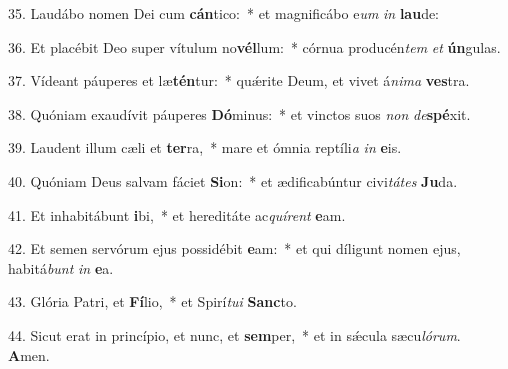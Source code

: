 35. Laudábo nomen Dei cum \textbf{cán}tico:~*  et magnificábo e\textit{um} \textit{in} \textbf{lau}de:\

36. Et placébit Deo super vítulum no\textbf{vél}lum:~*  córnua producén\textit{tem} \textit{et} \textbf{ún}gulas.\

37. Vídeant páuperes et læ\textbf{tén}tur:~*  quǽrite Deum, et vivet á\textit{ni}\textit{ma} \textbf{ves}tra.\

38. Quóniam exaudívit páuperes \textbf{Dó}minus:~*  et vinctos suos \textit{non} \textit{de}\textbf{spé}xit.\

39. Laudent illum cæli et \textbf{ter}ra,~*  mare et ómnia reptíli\textit{a} \textit{in} \textbf{e}is.\

40. Quóniam Deus salvam fáciet \textbf{Si}on:~*  et ædificabúntur civi\textit{tá}\textit{tes} \textbf{Ju}da.\

41. Et inhabitábunt \textbf{i}bi,~*  et hereditáte ac\textit{quí}\textit{rent} \textbf{e}am.\

42. Et semen servórum ejus possidébit \textbf{e}am:~*  et qui díligunt nomen ejus, habitá\textit{bunt} \textit{in} \textbf{e}a.\

43. Glória Patri, et \textbf{Fí}lio,~*  et Spirí\textit{tu}\textit{i} \textbf{Sanc}to.\

44. Sicut erat in princípio, et nunc, et \textbf{sem}per,~*  et in sǽcula sæcu\textit{ló}\textit{rum}. \textbf{A}men.\

